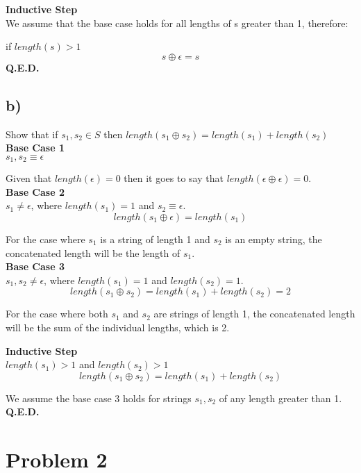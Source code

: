 \documentclass[11pt, numbers=endperiod, parskip=half]{scrartcl}
\begin{document}
\textbf{Inductive Step}\\
We assume that the base case holds for all lengths of s greater than 1, therefore:

if \(length (s) > 1\)
\[
s \oplus \epsilon = s
\]
\textbf{Q.E.D.}
\subsection{b)}
Show that if \(s_1, s_2 \in S\) then \(length(s_1 \oplus s_2) = length(s_1) + length(s_2)\)\\
\textbf{Base Case 1}\\
\(s_1, s_2 \equiv \epsilon\)

Given that \(length(\epsilon) = 0\) then it goes to say that \(length(\epsilon \oplus \epsilon) = 0\).\\

\textbf{Base Case 2}\\
\(s_1 \neq \epsilon\), where \(length(s_1) = 1\) and \(s_2 \equiv \epsilon\).
\[
length(s_1 \oplus \epsilon) = length(s_1)
\]

For the case where \(s_1\) is a string of length 1 and \(s_2\) is an empty string, the concatenated length will be the length of \(s_1\).\\

\textbf{Base Case 3}\\
\(s_1, s_2 \neq \epsilon\), where \(length(s_1) = 1\) and \(length(s_2) = 1\).
\[
length(s_1 \oplus s_2) = length(s_1) + length(s_2) = 2
\]

For the case where both \(s_1\) and \(s_2\) are strings of length 1, the concatenated length will be the sum of the individual lengths, which is 2.

\textbf{Inductive Step} \\
\(length(s_1) > 1\) and \(length(s_2) > 1\)
\[
length(s_1 \oplus s_2) = length(s_1) + length(s_2)
\]

We assume the base case 3 holds for strings \(s_1, s_2\) of any length greater than 1.\\

\textbf{Q.E.D.}
\section{Problem 2}
\inputminted{prolog}{list_check.pl}
\end{document}
